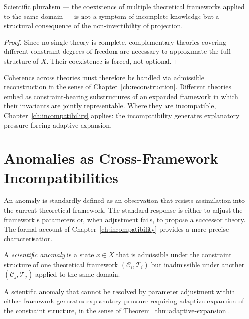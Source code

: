 \documentclass[11pt,openany]{book}
\begin{document}
\begin{corollary}
\label{cor:pluralism}
Scientific pluralism --- the coexistence of multiple
theoretical frameworks applied to the same domain --- is
not a symptom of incomplete knowledge but a structural
consequence of the non-invertibility of projection.
\end{corollary}

\begin{proof}
Since no single theory is complete, complementary theories
covering different constraint degrees of freedom are
necessary to approximate the full structure of $X$.
Their coexistence is forced, not optional.
\end{proof}

Coherence across theories must therefore be handled via
admissible reconstruction in the sense of
Chapter~\ref{ch:reconstruction}.  Different theories embed
as constraint-bearing substructures of an expanded
framework in which their invariants are jointly
representable.  Where they are incompatible,
Chapter~\ref{ch:incompatibility} applies: the
incompatibility generates explanatory pressure forcing
adaptive expansion.

\section{Anomalies as Cross-Framework Incompatibilities}
\label{sec:anomalies}

An anomaly is standardly defined as an observation that
resists assimilation into the current theoretical
framework.  The standard response is either to adjust the
framework's parameters or, when adjustment fails, to
propose a successor theory.  The formal account of
Chapter~\ref{ch:incompatibility} provides a more precise
characterisation.

\begin{definition}
\label{def:anomaly}
A \emph{scientific anomaly} is a state $x \in X$ that is
admissible under the constraint structure of one
theoretical framework $(\mathcal{C}_i, \mathcal{T}_i)$
but inadmissible under another $(\mathcal{C}_j,
\mathcal{T}_j)$ applied to the same domain.
\end{definition}

\begin{proposition}
\label{prop:anomaly-pressure}
A scientific anomaly that cannot be resolved by parameter
adjustment within either framework generates explanatory
pressure requiring adaptive expansion of the constraint
structure, in the sense of
Theorem~\ref{thm:adaptive-expansion}.
\end{proposition}
\end{document}
